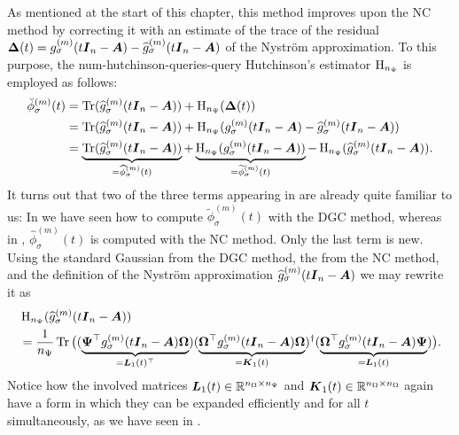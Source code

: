 As mentioned at the start of this chapter, this method improves
upon the \gls{NC} method by correcting it with an estimate of the trace of the
residual $\boldsymbol{\Delta}(t) = g_{\sigma}^{(m)}(t\boldsymbol{I}_n - \boldsymbol{A}) - \widehat{g}_{\sigma}^{(m)}(t\boldsymbol{I}_n - \boldsymbol{A})$
of the Nystr\"om approximation. To this purpose, the \gls{num-hutchinson-queries}-query
Hutchinson's estimator $\operatorname{H}_{n_{\Psi}}$
 is employed as follows:
\begin{align}
    \breve{\phi}_{\sigma}^{(m)}(t)
    &= \operatorname{Tr}(\widehat{g}_{\sigma}^{(m)}(t\boldsymbol{I}_n - \boldsymbol{A}))
    + \operatorname{H}_{n_{\Psi}}(\boldsymbol{\Delta}(t)) \notag \\
    &= \operatorname{Tr}(\widehat{g}_{\sigma}^{(m)}(t\boldsymbol{I}_n - \boldsymbol{A}))
    + \operatorname{H}_{n_{\Psi}}(g_{\sigma}^{(m)}(t\boldsymbol{I}_n - \boldsymbol{A}) - \widehat{g}_{\sigma}^{(m)}(t\boldsymbol{I}_n - \boldsymbol{A})) \notag \\
    &= \underbrace{\operatorname{Tr}(\widehat{g}_{\sigma}^{(m)}(t\boldsymbol{I}_n - \boldsymbol{A}))}_{=\widehat{\phi}_{\sigma}^{(m)}(t)}
    + \underbrace{\operatorname{H}_{n_{\Psi}}(g_{\sigma}^{(m)}(t\boldsymbol{I}_n - \boldsymbol{A}))}_{=\widetilde{\phi}_{\sigma}^{(m)}(t)}
    - \operatorname{H}_{n_{\Psi}}(\widehat{g}_{\sigma}^{(m)}(t\boldsymbol{I}_n - \boldsymbol{A})).
    \label{equ:4-nystromchebyshev-spectral-density-decomposition}
\end{align}
It turns out that two of the three terms appearing in 
are already quite familiar to us: In  we have seen
how to compute $\widetilde{\phi}_{\sigma}^{(m)}(t)$ with the \gls{DGC} method, whereas
in , $\widehat{\phi}_{\sigma}^{(m)}(t)$ is computed with the \gls{NC}
method. Only the last term is new. Using the standard Gaussian 
from the \gls{DGC} method, the  from the \gls{NC} method,
and the definition of the Nystr\"om approximation
$\widehat{g}_{\sigma}^{(m)}(t\boldsymbol{I}_n - \boldsymbol{A})$ 
we may rewrite it as
\begin{align*}
    &\operatorname{H}_{n_{\Psi}}(\widehat{g}_{\sigma}^{(m)}(t\boldsymbol{I}_n - \boldsymbol{A}))\\
    &=\frac{1}{n_{\Psi}}\operatorname{Tr}\big(
        (\underbrace{\boldsymbol{\Psi}^{\top} g_{\sigma}^{(m)}(t\boldsymbol{I}_n - \boldsymbol{A}) \boldsymbol{\Omega}}_{=\boldsymbol{L}_1(t)^{\top}})
        (\underbrace{\boldsymbol{\Omega}^{\top} g_{\sigma}^{(m)}(t\boldsymbol{I}_n - \boldsymbol{A}) \boldsymbol{\Omega}}_{=\boldsymbol{K}_1(t)})^{\dagger}
        (\underbrace{\boldsymbol{\Omega}^{\top} g_{\sigma}^{(m)}(t\boldsymbol{I}_n - \boldsymbol{A}) \boldsymbol{\Psi}}_{=\boldsymbol{L}_1(t)})
    \big).
\end{align*}
Notice how the involved matrices $\boldsymbol{L}_1(t) \in \mathbb{R}^{n_{\Omega} \times n_{\Psi}}$ and $\boldsymbol{K}_1(t) \in \mathbb{R}^{n_{\Omega} \times n_{\Omega}}$
again have a form in which they can be expanded efficiently and for all $t$ simultaneously,
as we have seen in .\\

